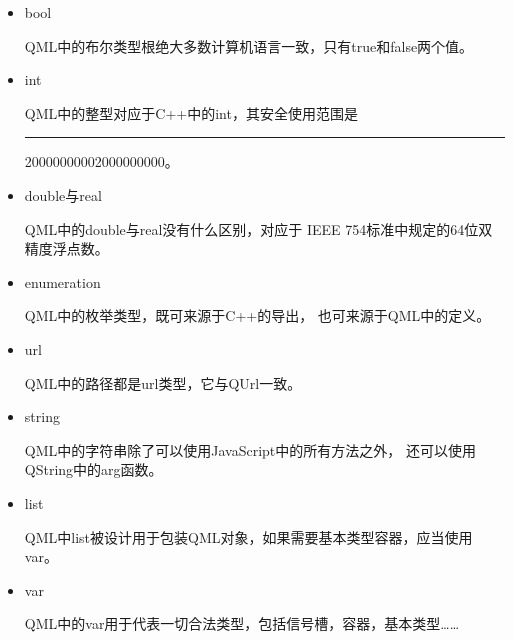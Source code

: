 \begin{itemize}

\item bool 

QML中的布尔类型根绝大多数计算机语言一致，只有true和false两个值。
\item int

QML中的整型对应于C{\sourcefonttwo{}+}{\sourcefonttwo{}+}中的int，其安全使用范围是
 \hspace{0.05em}\rule[0.7ex]{0.4em}{0.65pt}\hspace{0.05em}2000000000\raisebox{0.16ex}{\sourcefonttwo\~{}}2000000000。
\item double与real

QML中的double与real没有什么区别，对应于
IEEE 754标准中规定的64位双精度浮点数。
\item enumeration

QML中的枚举类型，既可来源于C{\sourcefonttwo{}+}{\sourcefonttwo{}+}的导出，
也可来源于QML中的定义。
\item url

QML中的路径都是url类型，它与QUrl一致。
\item string

QML中的字符串除了可以使用JavaScript中的所有方法之外，
还可以使用QString中的arg函数。
\item list

QML中list被设计用于包装QML对象，如果需要基本类型容器，应当使用var。
\item var

QML中的var用于代表一切合法类型，包括信号槽，容器，基本类型……

\end{itemize}



















